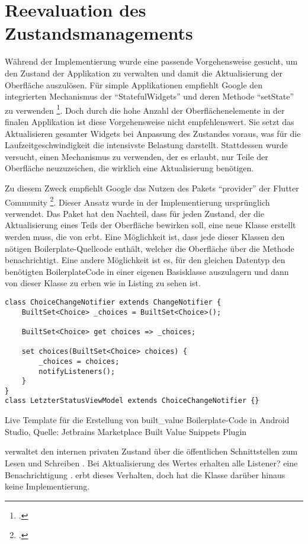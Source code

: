 
\section{Reevaluation des Zustandsmanagements}
\label{sec:Reevaluation-des-Zustandsmanagements}


Während der Implementierung wurde eine passende Vorgehensweise gesucht,
um den Zustand der Applikation zu verwalten
und damit die Aktualisierung der Oberfläche auszulösen.
Für simple Applikationen empfiehlt Google den integrierten Mechanismus der \enquote{StatefulWidgets} und deren Methode \enquote{setState} zu verwenden \footcite[Vgl.][]{AddingInteractivityToYourFlutterApp}.
Doch durch die hohe Anzahl der Oberflächenelemente in der finalen Applikation ist diese Vorgehensweise nicht empfehlenswert.
Sie setzt das Aktualisieren gesamter Widgets bei Anpassung des Zustandes voraus,
was für die Laufzeitgeschwindigkeit die intensivste Belastung darstellt.
Stattdessen wurde versucht,
einen Mechanismus zu verwenden,
der es erlaubt,
nur Teile der Oberfläche neuzuzeichen,
die wirklich eine Aktualisierung benötigen.

Zu diesem Zweck empfiehlt Google das Nutzen des Pakets \enquote{provider} der Flutter Community \footcite[Vgl.][]{ProviderARecommendedApproach}.
Dieser Ansatz wurde in der Implementierung ursprünglich verwendet.
Das Paket hat den Nachteil,
dass für jeden Zustand,
der die Aktualisierung eines Teils der Oberfläche bewirken soll,
eine neue Klasse erstellt werden muss, die von  erbt.
Eine Möglichkeit ist,
dass jede dieser Klassen den nötigen Boilerplate-Quellcode enthält,
welcher die Oberfläche über die Methode  benachrichtigt.
Eine andere Möglichkeit ist es, für den gleichen Datentyp den benötigten BoilerplateCode in einer eigenen Basisklasse auszulagern
und dann von dieser Klasse zu erben wie in Listing \label{lst:ChoiceChangeNotifier} zu sehen ist.
\ifIncludeFigures
  \begin{listing}[h]
    \begin{verbatim}
class ChoiceChangeNotifier extends ChangeNotifier {
    BuiltSet<Choice> _choices = BuiltSet<Choice>();

    BuiltSet<Choice> get choices => _choices;

    set choices(BuiltSet<Choice> choices) {
        _choices = choices;
        notifyListeners();
    }
}
class LetzterStatusViewModel extends ChoiceChangeNotifier {}
\end{verbatim}
    \caption[built_value Live Template]{Live Template für die Erstellung von built_value Boilerplate-Code in Android Studio, Quelle: Jetbrains Marketplace Built Value Snippets Plugin}
    \label{lst:ChoiceChangeNotifier}
  \end{listing}
\fi
{} verwaltet den internen privaten Zustand   über die öffentlichen Schnittstellen zum Lesen  und Schreiben .
Bei Aktualisierung des Wertes erhalten alle Listener? eine Benachrichtigung .
 erbt dieses Verhalten, doch hat die Klasse darüber hinaus keine Implementierung.

